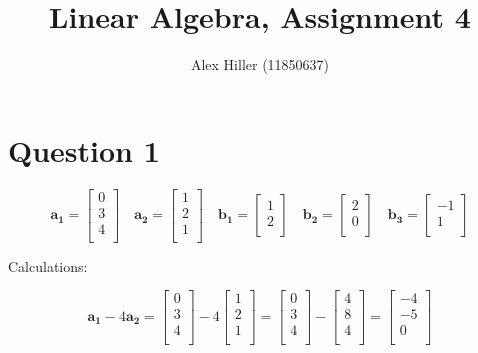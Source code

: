 \documentclass{article}
\author{Alex Hiller (11850637)}
\title{Linear Algebra, Assignment 4}
\begin{document}
\maketitle
\clearpage

\section{Question 1}
\[
    \mathbf{a_1} = 
    \begin{bmatrix}
        0 \\ 
        3 \\ 
        4 \\
    \end{bmatrix}
    \quad 
    \mathbf{a_2} =
    \begin{bmatrix}
        1\\
        2\\
        1\\
    \end{bmatrix}
    \quad
    \mathbf{b_1} = 
    \begin{bmatrix}
        1 \\
        2 \\
    \end{bmatrix}
    \quad 
    \mathbf{b_2} = 
    \begin{bmatrix}
        2 \\
        0 \\
    \end{bmatrix}
    \quad 
    \mathbf{b_3} = 
    \begin{bmatrix}
        -1 \\
        1 \\
    \end{bmatrix}
\]


Calculations:


\[
    \mathbf{a_1} -
    4 \mathbf{a_2} =
    \begin{bmatrix}
        0 \\ 3 \\ 4 \\
    \end{bmatrix}
    -4
    \begin{bmatrix}
        1\\ 2\\ 1\\
    \end{bmatrix}
    =
    \begin{bmatrix}
        0 \\ 3 \\ 4 \\
    \end{bmatrix}
    -
    \begin{bmatrix}
        4\\ 8\\ 4\\
    \end{bmatrix}
    =
    \begin{bmatrix}
        -4 \\ -5 \\ 0 \\
    \end{bmatrix}
\]
\end{document}
